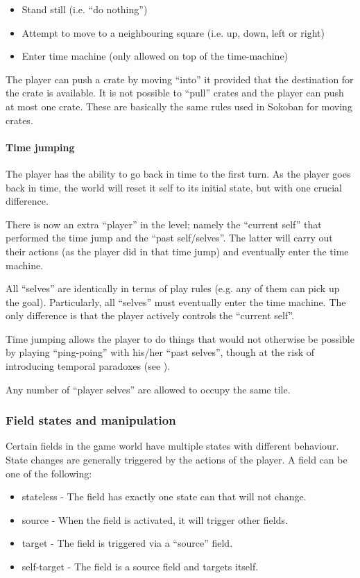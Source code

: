 \begin{itemize}
\item Stand still (i.e. ``do nothing'')
\item Attempt to move to a neighbouring square (i.e. up, down, left or right)
\item Enter time machine (only allowed on top of the time-machine)
\end{itemize}

The player can push a crate by moving ``into'' it provided that the
destination for the crate is available.  It is not possible to
``pull'' crates and the player can push at most one crate.  These
are basically the same rules used in Sokoban for moving crates.

\paragraph{Time jumping}
The player has the ability to go back in time to the first turn.  As
the player goes back in time, the world will reset it self to its
initial state, but with one crucial difference.

There is now an extra ``player'' in the level; namely the ``current
self'' that performed the time jump and the ``past self/selves''.  The
latter will carry out their actions (as the player did in that time
jump) and eventually enter the time machine.

All ``selves'' are identically in terms of play rules (e.g. any of
them can pick up the goal).  Particularly, all ``selves'' must
eventually enter the time machine.  The only difference is that the
player actively controls the ``current self''.

Time jumping allows the player to do things that would not otherwise
be possible by playing ``ping-poing'' with his/her ``past selves'',
though at the risk of introducing temporal paradoxes (see
).

Any number of ``player selves'' are allowed to occupy the same
tile.

\subsubsection{Field states and manipulation}
\label{field-states}
Certain fields in the game world have multiple states with different
behaviour.  State changes are generally triggered by the actions of
the player.  A field can be one of the following:

\begin{itemize}
\item stateless - The field has exactly one state can that will not change.
\item source - When the field is activated, it will trigger other fields.
\item target - The field is triggered via a ``source'' field.
\item self-target - The field is a source field and targets itself.
\end{itemize}

